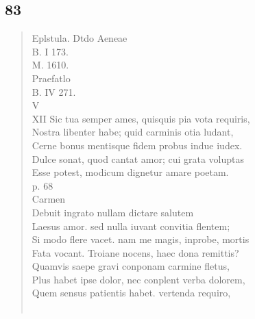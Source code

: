 \documentclass[11pt, a4paper]{report}
\begin{document}
            \subsection*{83}
      \begin{verse}
       \lbrack Eplstula. Dtdo Aeneae \rbrack  \\ B. I 173. \\ M. 1610. \\ Praefatlo \\ B. IV 271. \\ V \\ XII Sic tua semper ames, quisquis pia vota requiris, \\ Nostra libenter habe; quid carminis otia ludant, \\ Cerne bonus mentisque fidem probus indue iudex. \\ Dulce sonat, quod cantat amor; cui grata voluptas \\ Esse potest, modicum dignetur amare poetam. \\ p. 68 \\ Carmen \\ Debuit ingrato nullam dictare salutem \\ Laesus amor. sed nulla iuvant convitia flentem; \\ Si modo flere vacet. nam me magis, inprobe, mortis \\ Fata vocant. Troiane nocens, haec dona remittis? \\ Quamvis saepe gravi conponam carmine fletus, \\ Plus habet ipse dolor, nec conplent verba dolorem, \\ Quem sensus patientis habet. vertenda requiro, \\ 
        ﻿\pagebreak 

\end{verse}
\end{document}
